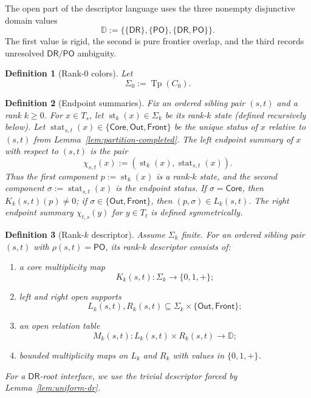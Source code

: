 \documentclass[11pt]{article}
\newtheorem{definition}{Definition}[section]
\theoremstyle{remark}
\newcommand{\DR}{\mathsf{DR}}
\newcommand{\PO}{\mathsf{PO}}
\newcommand{\Tp}{\operatorname{Tp}}
\newcommand{\st}{\operatorname{st}}
\newcommand{\stat}{\operatorname{stat}}
\newcommand{\Core}{\mathsf{Core}}
\newcommand{\Out}{\mathsf{Out}}
\newcommand{\Front}{\mathsf{Front}}
\newcommand{\OpenDom}{\mathbb{D}}
\begin{document}
The open part of the descriptor language uses the three nonempty disjunctive domain values
\[
\OpenDom:=\bigl\{\{\DR\},\{\PO\},\{\DR,\PO\}\bigr\}.
\]
The first value is rigid, the second is pure frontier overlap, and the third records unresolved $\DR/\PO$ ambiguity.

\begin{definition}[Rank-$0$ colors]
Let
\[
\Sigma_0:=\Tp(C_0).
\]
\end{definition}

\begin{definition}[Endpoint summaries]\label{def:endpoint-summary}
Fix an ordered sibling pair $(s,t)$ and a rank $k\ge 0$. For $x\in T_s$, let $\st_k(x)\in\Sigma_k$ be its rank-$k$ state (defined recursively below). Let $\stat_{s,t}(x)\in\{\Core,\Out,\Front\}$ be the unique status of $x$ relative to $(s,t)$ from Lemma~\ref{lem:partition-completed}. The \emph{left endpoint summary} of $x$ with respect to $(s,t)$ is the pair
\[
\chi_{s,t}(x):=(\st_k(x),\stat_{s,t}(x)).
\]
Thus the first component $p:=\st_k(x)$ is a rank-$k$ state, and the second component $\sigma:=\stat_{s,t}(x)$ is the endpoint status. If $\sigma=\Core$, then $K_k(s,t)(p)\neq 0$; if $\sigma\in\{\Out,\Front\}$, then $(p,\sigma)\in L_k(s,t)$. The \emph{right endpoint summary} $\chi_{t,s}(y)$ for $y\in T_t$ is defined symmetrically.
\end{definition}

\begin{definition}[Rank-$k$ descriptor]\label{def:descriptor-full}
Assume $\Sigma_k$ finite. For an ordered sibling pair $(s,t)$ with $\rho(s,t)=\PO$, its rank-$k$ descriptor consists of:
\begin{enumerate}[label=(\roman*)]
    \item a core multiplicity map
    \[
    K_k(s,t):\Sigma_k\to\{0,1,+\};
    \]
    \item left and right open supports
    \[
    L_k(s,t),R_k(s,t)\subseteq \Sigma_k\times\{\Out,\Front\};
    \]
    \item an open relation table
    \[
    M_k(s,t):L_k(s,t)\times R_k(s,t)\to\OpenDom;
    \]
    \item bounded multiplicity maps on $L_k$ and $R_k$ with values in $\{0,1,+\}$.
\end{enumerate}
For a $\DR$-root interface, we use the trivial descriptor forced by Lemma~\ref{lem:uniform-dr}.
\end{definition}
\end{document}
